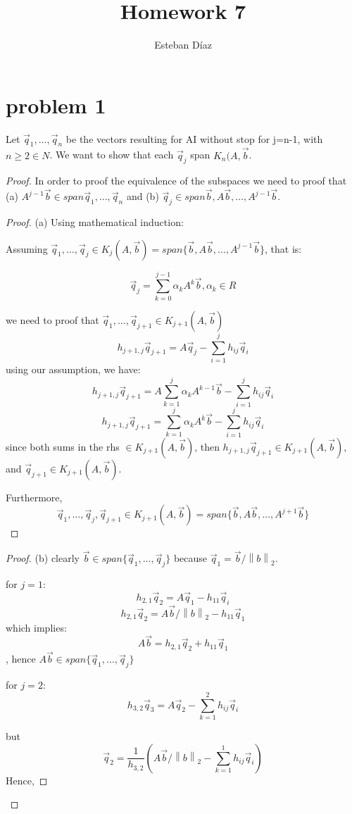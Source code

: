 \documentclass[10pt]{article}
\author{Esteban D\'{i}az}
\title{Homework 7}{}
\newcommand{\normt}[1]{\left\lVert#1\right\rVert_2}
\def\q#1{\vec{q}_{#1}}
\def\krylovs#1{K_{#1}(A,\vec{b})=span \{\vec{b},A\vec{b},\dots,A^{#1}\vec{b}\}}
\begin{document}
\maketitle
\section{problem 1}
  Let $\vec{q}_1,\dots,\vec{q}_n$ be the vectors resulting 
for AI without stop for j=n-1, with $n\geq 2 \in N$. We want to 
show that each $\vec{q}_j$ span $K_n(A,\vec{b}$. 

\begin{proof}
  In order to proof the equivalence of the subspaces we need to proof
that (a) $A^{j-1}\vec{b} \in span{\vec{q}_1,\dots,\vec{q}_n}$ and (b)
$\vec{q}_j \in span{\vec{b},A\vec{b},\dots,A^{j-1}\vec{b}}$.


 \begin{proof}
  (a) Using mathematical induction:

    Assuming $\vec{q}_1,\dots,\vec{q}_j \in K_j(A,\vec{b}) = span\{\vec{b},A\vec{b},\dots,A^{j-1}\vec{b}\}$, that is:

  \[
  \vec{q}_j = \sum_{k=0}^{j-1} \alpha_k A^k\vec{b}, \alpha_k\in R
  \]

  we need to proof that $\vec{q}_1,\dots,\vec{q}_{j+1} \in K_{j+1}(A,\vec{b}) $
  \[
    h_{j+1,j} \q{j+1} = A\q{j}-\sum_{i=1}^j h_{ij}\q{i}
  \] 
  using our assumption, we have:
  \[
    h_{j+1,j} \q{j+1} = A\sum_{k=1}^j \alpha_k A^{k-1}\vec{b}-\sum_{i=1}^j h_{ij}\q{i}
  \] 
  \[
    h_{j+1,j} \q{j+1} = \sum_{k=1}^j \alpha_k A^{k}\vec{b}-\sum_{i=1}^j h_{ij}\q{i}
  \] 
  since both sums in the rhs $\in K_{j+1}(A,\vec{b})$, then $ h_{j+1,j} \q{j+1} \in K_{j+1}(A,\vec{b})$, and 
  $\q{j+1} \in K_{j+1}(A,\vec{b})$. 

  Furthermore,
  \[\q{1},\dots,\q{j},\q{j+1} \in \krylovs{j+1}\]
  \end{proof} 


  \begin{proof}
    (b) clearly $\vec{b} \in span \{\q{1},\dots,\q{j} \}$ because $\q{1} = \vec{b}/\normt{b}$.

    for $j=1$:
    \[h_{2,1}\q{2} = A\q{1} - h_{11}\q{i}\]
    \[h_{2,1}\q{2} = A\vec{b}/\normt{b} - h_{11}\q{1}\]
    which implies:
    \[
     A\vec{b} = h_{2,1}\q{2} + h_{11}\q{1}
    \], hence $   A\vec{b}  \in span \{\q{1},\dots,\q{j} \}$

    for $j=2$:
    \[h_{3,2}\q{3} = A\q{2} - \sum_{k=1}^2 h_{ij}\q{i}\]

    but 
  \[\q{2} = \frac{1}{h_{3,2}}\left( A\vec{b}/\normt{b} - \sum_{k=1}^1 h_{ij}\q{i} \right)\]
    Hence,


\end{proof}
\end{proof}
\end{document}
